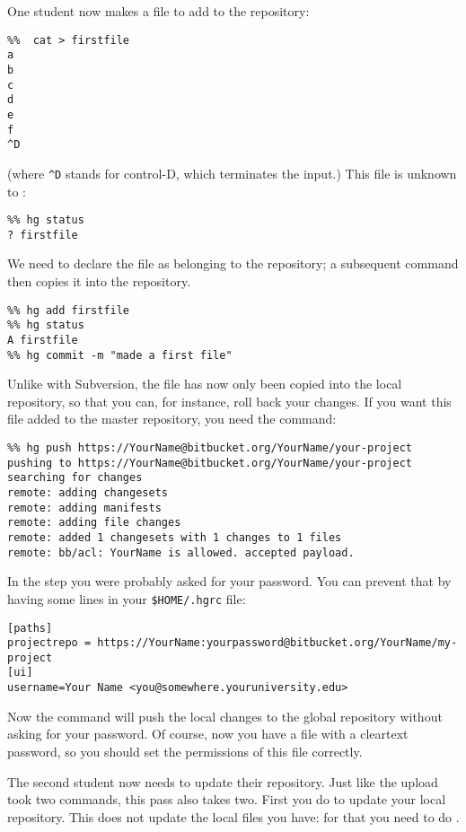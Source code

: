 One student now makes a file to add to the repository:
\begin{verbatim}
%%  cat > firstfile
a
b
c
d
e
f
^D
\end{verbatim}
(where \verb+^D+ stands for control-D, which terminates the input.)
This file is unknown to :
\begin{verbatim}
%% hg status
? firstfile
\end{verbatim}
We need to declare the file as belonging to the repository; a
subsequent  command then copies it into the repository.
\begin{verbatim}
%% hg add firstfile 
%% hg status
A firstfile
%% hg commit -m "made a first file"
\end{verbatim}
Unlike with Subversion, the file has now only been copied into the 
local repository, so that you can, for instance, roll back your
changes. If you want this file added to the master repository,
you need the  command:
\begin{verbatim}
%% hg push https://YourName@bitbucket.org/YourName/your-project
pushing to https://YourName@bitbucket.org/YourName/your-project
searching for changes
remote: adding changesets
remote: adding manifests
remote: adding file changes
remote: added 1 changesets with 1 changes to 1 files
remote: bb/acl: YourName is allowed. accepted payload.
\end{verbatim}
In the  step you were probably asked for your password. You can
prevent that by having some lines in your \verb+$HOME/.hgrc+ file:
\begin{verbatim}
[paths]
projectrepo = https://YourName:yourpassword@bitbucket.org/YourName/my-project
[ui]
username=Your Name <you@somewhere.youruniversity.edu>
\end{verbatim}
Now the command  will push the local changes
to the global repository without asking for your password. Of course,
now you have a file with a cleartext password, so you should set the
permissions of this file correctly.

The second student now needs to update their repository. Just like
the upload took two commands, this pass also takes two. First you do  to update your local repository. This does not update the local files you have: for that you need to do .


